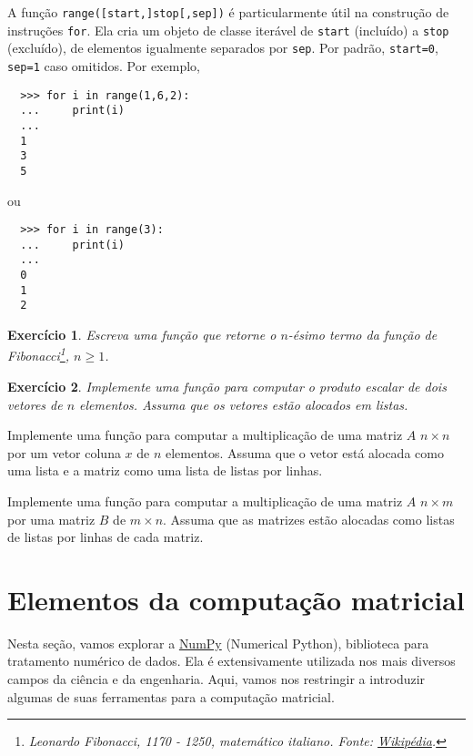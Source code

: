 \documentclass[12pt]{article}
\newtheorem{exr}{Exercício}[section]
\begin{document}
A função {\python} \lstinline+range([start,]stop[,sep])+ é particularmente útil na construção de instruções \lstinline+for+. Ela cria um objeto de classe iterável de \lstinline+start+ (incluído) a \lstinline+stop+ (excluído), de elementos igualmente separados por \lstinline+sep+. Por padrão, \lstinline+start=0+, \lstinline+sep=1+ caso omitidos. Por exemplo,
\begin{lstlisting}
  >>> for i in range(1,6,2):
  ...     print(i)
  ... 
  1
  3
  5
\end{lstlisting}
ou
\begin{lstlisting}
  >>> for i in range(3):
  ...     print(i)
  ... 
  0
  1
  2
\end{lstlisting}

\begin{exr}
  Escreva uma função que retorne o $n$-ésimo termo da função de Fibonacci\footnote{Leonardo Fibonacci, 1170 - 1250, matemático italiano. Fonte: \href{https://pt.wikipedia.org/wiki/Leonardo\_Fibonacci}{Wikipédia}.}, $n\geq 1$. 
\end{exr}

\begin{exr}
  Implemente uma função para computar o produto escalar de dois vetores de $n$ elementos. Assuma que os vetores estão alocados em listas.
\end{exr}

\begin{exer}
  Implemente uma função para computar a multiplicação de uma matriz $A$ $n\times n$ por um vetor coluna $x$ de $n$ elementos. Assuma que o vetor está alocada como uma lista e a matriz como uma lista de listas por linhas.
\end{exer}

\begin{exer}
  Implemente uma função para computar a multiplicação de uma matriz $A$ $n\times m$ por uma matriz $B$ de $m\times n$. Assuma que as matrizes estão alocadas como listas de listas por linhas de cada matriz.
\end{exer}

\section{Elementos da computação matricial}

Nesta seção, vamos explorar a \href{https://numpy.org/}{NumPy} (Numerical Python), biblioteca para tratamento numérico de dados. Ela é extensivamente utilizada nos mais diversos campos da ciência e da engenharia. Aqui, vamos nos restringir a introduzir algumas de suas ferramentas para a computação matricial.
\end{document}
